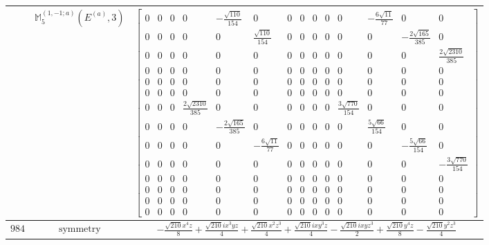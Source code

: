 \documentclass[fleqn,8pt,landscape]{jsarticle}
\begin{document}
\begin{longtable}{ccc}
$  $ & $ \mathbb{M}_{5}^{(1,-1;a)}(E^{(a)},3) $ & $ \begin{bmatrix} 0 & 0 & 0 & 0 & - \frac{\sqrt{110}}{154} & 0 & 0 & 0 & 0 & 0 & 0 & - \frac{6 \sqrt{11}}{77} & 0 & 0 \\ 0 & 0 & 0 & 0 & 0 & \frac{\sqrt{110}}{154} & 0 & 0 & 0 & 0 & 0 & 0 & - \frac{2 \sqrt{165}}{385} & 0 \\ 0 & 0 & 0 & 0 & 0 & 0 & 0 & 0 & 0 & 0 & 0 & 0 & 0 & \frac{2 \sqrt{2310}}{385} \\ 0 & 0 & 0 & 0 & 0 & 0 & 0 & 0 & 0 & 0 & 0 & 0 & 0 & 0 \\ 0 & 0 & 0 & 0 & 0 & 0 & 0 & 0 & 0 & 0 & 0 & 0 & 0 & 0 \\ 0 & 0 & 0 & 0 & 0 & 0 & 0 & 0 & 0 & 0 & 0 & 0 & 0 & 0 \\ 0 & 0 & 0 & \frac{2 \sqrt{2310}}{385} & 0 & 0 & 0 & 0 & 0 & 0 & \frac{3 \sqrt{770}}{154} & 0 & 0 & 0 \\ 0 & 0 & 0 & 0 & - \frac{2 \sqrt{165}}{385} & 0 & 0 & 0 & 0 & 0 & 0 & \frac{5 \sqrt{66}}{154} & 0 & 0 \\ 0 & 0 & 0 & 0 & 0 & - \frac{6 \sqrt{11}}{77} & 0 & 0 & 0 & 0 & 0 & 0 & - \frac{5 \sqrt{66}}{154} & 0 \\ 0 & 0 & 0 & 0 & 0 & 0 & 0 & 0 & 0 & 0 & 0 & 0 & 0 & - \frac{3 \sqrt{770}}{154} \\ 0 & 0 & 0 & 0 & 0 & 0 & 0 & 0 & 0 & 0 & 0 & 0 & 0 & 0 \\ 0 & 0 & 0 & 0 & 0 & 0 & 0 & 0 & 0 & 0 & 0 & 0 & 0 & 0 \\ 0 & 0 & 0 & 0 & 0 & 0 & 0 & 0 & 0 & 0 & 0 & 0 & 0 & 0 \\ 0 & 0 & 0 & 0 & 0 & 0 & 0 & 0 & 0 & 0 & 0 & 0 & 0 & 0 \end{bmatrix} $ \\ \hline
$ 984 $ & $ \text{symmetry} $ & $ - \frac{\sqrt{210} x^{4} z}{8} + \frac{\sqrt{210} i x^{3} y z}{4} + \frac{\sqrt{210} x^{2} z^{3}}{4} + \frac{\sqrt{210} i x y^{3} z}{4} - \frac{\sqrt{210} i x y z^{3}}{2} + \frac{\sqrt{210} y^{4} z}{8} - \frac{\sqrt{210} y^{2} z^{3}}{4} $ \\

\end{longtable}
\end{document}
